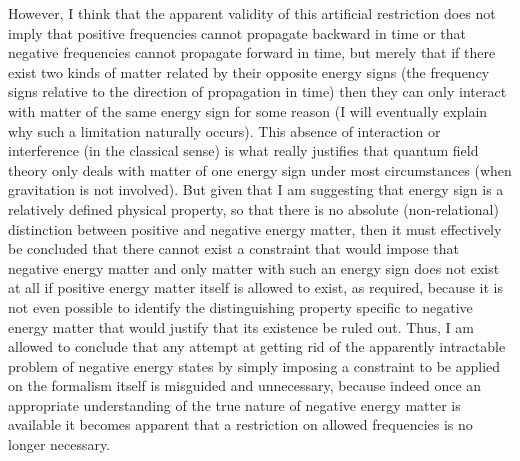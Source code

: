 \documentclass[notitlepage,12pt]{report}
\begin{document}
However, I think that the apparent validity of this artificial restriction does not imply that positive frequencies cannot propagate backward in time or that negative frequencies cannot propagate forward in time, but merely that if there exist two kinds of matter related by their opposite energy signs (the frequency signs relative to the direction of propagation in time) then they can only interact with matter of the same energy sign for some reason (I will eventually explain why such a limitation naturally occurs). This absence of interaction or interference (in the classical sense) is what really justifies that quantum field theory only deals with matter of one energy sign under most circumstances (when gravitation is not involved). But given that I am suggesting that energy sign is a relatively defined physical property, so that there is no absolute (non-relational) distinction between positive and negative energy matter, then it must effectively be concluded that there cannot exist a constraint that would impose that negative energy matter and only matter with such an energy sign does not exist at all if positive energy matter itself is allowed to exist, as required, because it is not even possible to identify the distinguishing property specific to negative energy matter that would justify that its existence be ruled out. Thus, I am allowed to conclude that any attempt at getting rid of the apparently intractable problem of negative energy states by simply imposing a constraint to be applied on the formalism itself is misguided and unnecessary, because indeed once an appropriate understanding of the true nature of negative energy matter is available it becomes apparent that a restriction on allowed frequencies is no longer necessary.
\end{document}
